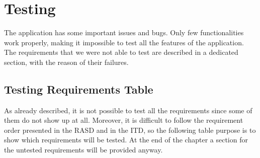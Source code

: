 \documentclass[../ATD.tex]{subfiles}
\begin{document}
    \chapter{Testing}\label{ch:testing}
    The application has some important issues and bugs.
    Only few functionalities work properly, making it impossible to test all the features of the application.
    The requirements that we were not able to test are described in a dedicated section, with the reason of their failures.

    \section{Testing Requirements Table}\label{sec:testing-requirements-table}
    As already described, it is not possible to test all the requirements since some of them do not show up at all.
    Moreover, it is difficult to follow the requirement order presented in the RASD and in the ITD, so the following table purpose is to show which requirements will be tested.
    At the end of the chapter a section for the untested requirements will be provided anyway.
\end{document}
